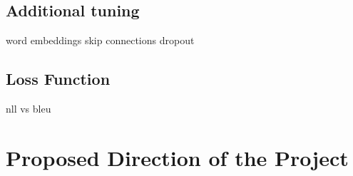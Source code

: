 \documentclass[11pt,a4paper]{article}
\begin{document}
\subsection *{Additional tuning}
  word embeddings
  skip connections
  dropout

\subsection *{Loss Function}
  nll vs bleu

\section *{Proposed Direction of the Project}

\bigskip



\end{document}
